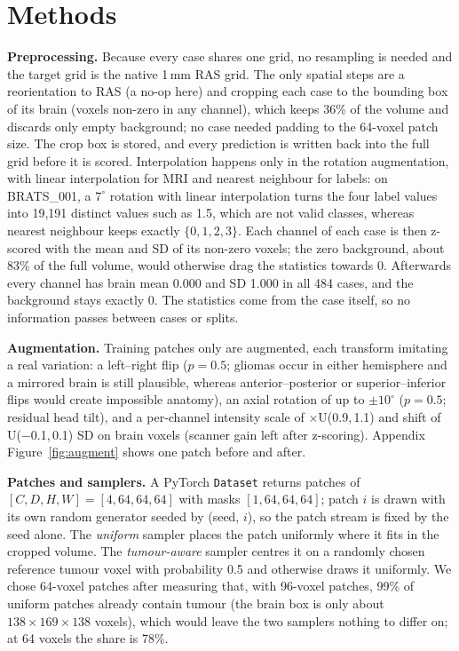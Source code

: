 \documentclass[11pt,a4paper]{article}
\begin{document}
\section{Methods}
\textbf{Preprocessing.} Because every case shares one grid, no resampling is needed and the target grid is the native
1\,mm RAS grid. The only spatial steps are a reorientation to RAS (a no-op here) and cropping each case to the bounding box
of its brain (voxels non-zero in any channel), which keeps 36\% of the volume and discards only empty background; no case
needed padding to the 64-voxel patch size. The crop box is stored, and every prediction is written back into the full
grid before it is scored. Interpolation happens only in the rotation augmentation, with linear interpolation for MRI and
nearest neighbour for labels: on BRATS\_001, a $7^\circ$ rotation with linear interpolation turns the four label values into
19,191 distinct values such as 1.5, which are not valid classes, whereas nearest neighbour keeps exactly $\{0,1,2,3\}$.
Each channel of each case is then z-scored with the mean and SD of its non-zero voxels; the zero background, about 83\% of
the full volume, would otherwise drag the statistics towards 0. Afterwards every channel has brain mean 0.000 and SD 1.000
in all 484 cases, and the background stays exactly 0. The statistics come from the case itself, so no information passes
between cases or splits.

\textbf{Augmentation.} Training patches only are augmented, each transform imitating a real variation: a left--right flip
($p=0.5$; gliomas occur in either hemisphere and a mirrored brain is still plausible, whereas anterior--posterior or
superior--inferior flips would create impossible anatomy), an axial rotation of up to $\pm10^\circ$ ($p=0.5$; residual head
tilt), and a per-channel intensity scale of $\times$U(0.9,\,1.1) and shift of U($-$0.1,\,0.1) SD on brain voxels (scanner
gain left after z-scoring). Appendix Figure~\ref{fig:augment} shows one patch before and after.

\textbf{Patches and samplers.} A PyTorch \texttt{Dataset} returns patches of $[C,D,H,W]=[4,64,64,64]$ with masks
$[1,64,64,64]$; patch $i$ is drawn with its own random generator seeded by (seed, $i$), so the patch stream is fixed by the
seed alone. The \emph{uniform} sampler places the patch uniformly where it fits in the cropped volume. The
\emph{tumour-aware} sampler centres it on a randomly chosen reference tumour voxel with probability 0.5 and otherwise draws it
uniformly. We chose 64-voxel patches after measuring that, with 96-voxel patches, 99\% of uniform patches already contain
tumour (the brain box is only about $138\times169\times138$ voxels), which would leave the two samplers nothing to differ on;
at 64 voxels the share is 78\%.
\end{document}
